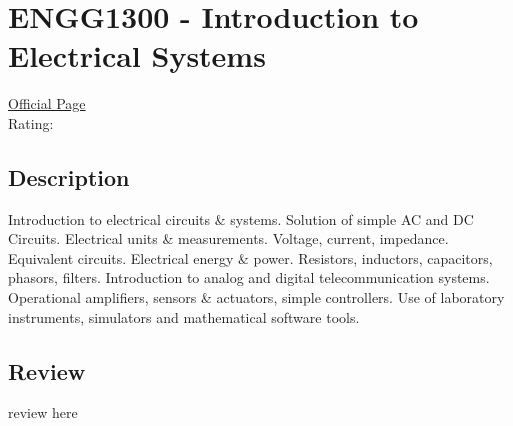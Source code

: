 \hypertarget{ENGG1300}{\section{ENGG1300 - Introduction to Electrical Systems}}

\large
\textcolor{turbo_purple}{\href{https://my.uq.edu.au/programs-courses/course.html?course_code=ENGG1300}{Official Page}} \\
Rating: \cstar\cstar\cstar\cstar\ostar

\normalsize
\subsection*{Description}
Introduction to electrical circuits \& systems.
Solution of simple AC and DC Circuits.
Electrical units \& measurements.
Voltage, current, impedance.
Equivalent circuits.
Electrical energy \& power.
Resistors, inductors, capacitors, phasors, filters.
Introduction to analog and digital telecommunication systems.
Operational amplifiers, sensors \& actuators, simple controllers.
Use of laboratory instruments, simulators and mathematical software tools.

\subsection*{Review}
review here
